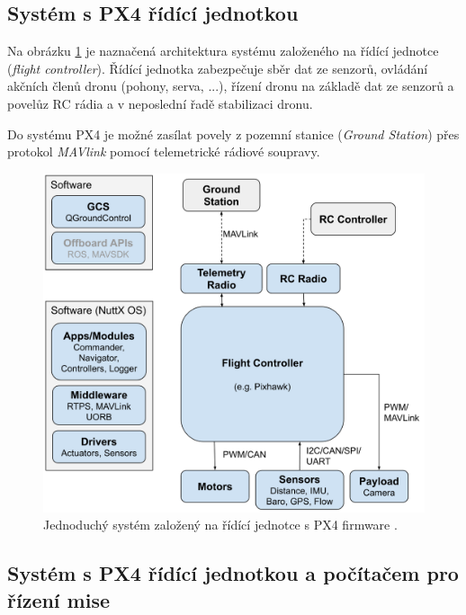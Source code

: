 \subsection{Systém s PX4 řídící jednotkou}

Na obrázku \ref{fig:PX4_FC} je naznačená architektura systému založeného na řídící jednotce (\textit{flight controller}). Řídící jednotka zabezpečuje sběr dat ze senzorů, ovládání akčních členů dronu (pohony, serva, ...), řízení dronu na základě dat ze senzorů a povelů\break z RC rádia a v neposlední řadě stabilizaci dronu.

Do systému PX4 je možné zasílat povely z pozemní stanice (\textit{Ground Station}) přes protokol \textit{MAVlink} pomocí telemetrické rádiové soupravy.

\begin{figure}[!ht]
    \begin{center}
        \includegraphics[scale=0.37]{obrazky/PX42}
    \end{center}
    \caption[Jednoduchý systém založený na řídící jednotce s PX4 firmware]{Jednoduchý systém založený na řídící jednotce s PX4 firmware \cite{PX4docs}.}
    \label{fig:PX4_FC}
\end{figure}

\subsection{Systém s PX4 řídící jednotkou a počítačem pro řízení mise}


